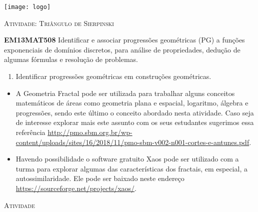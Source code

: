 \documentclass[10 pt,usenames,dvipsnames, oneside]{article}
\begin{document}
\begin{center}
  \begin{minipage}[l]{3cm}
\texttt{[image: logo]}    
\end{minipage}\hfill
\begin{minipage}[r]{.8\textwidth}
 {\Large \scshape Atividade: Triângulo de Sierpinski}  
\end{minipage}
\end{center}
\vspace{.2cm}

\ifdefined\prof
\begin{objetivos}
\item \textbf{EM13MAT508} Identificar e associar progressões geométricas (PG) a funções exponenciais de domínios discretos, para análise de propriedades, dedução de algumas fórmulas e resolução de problemas.
\end{objetivos}

\begin{goals}
\begin{enumerate}
	\item Identificar progressões geométricas em construções geométricas.
\end{enumerate}

\tcblower

\begin{itemize}
\item A Geometria Fractal pode ser utilizada para trabalhar alguns conceitos matemáticos de áreas como geometria plana e espacial, logaritmo, álgebra e progressões, sendo este último o conceito abordado nesta atividade. Caso seja de interesse explorar mais este assunto com os seus estudantes sugerimos essa referência \url{http://pmo.sbm.org.br/wp-content/uploads/sites/16/2018/11/pmo-sbm-v002-n001-cortes-e-antunes.pdf}.

\item Havendo possibilidade o software gratuito Xaos pode ser utilizado com a turma para explorar algumas das características dos fractais, em especial, a autossimilaridade. Ele pode ser baixado neste endereço \url{https://sourceforge.net/projects/xaos/}.

\end{itemize}
\end{goals}

\bigskip
\begin{center}
{\large \scshape Atividade}
\end{center}
\fi
\end{document}
